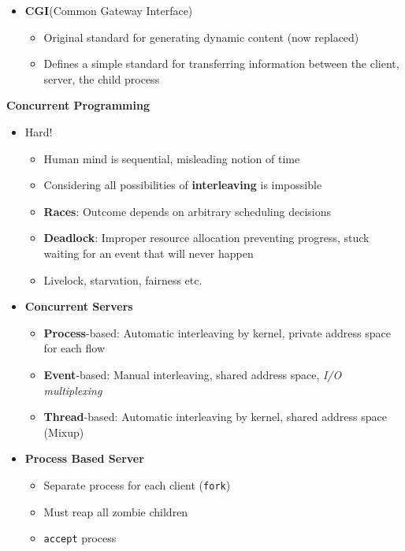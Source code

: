 \documentclass[12pt]{article}
\newcommand{\cname}[1]{\large \textbf{#1}}
\begin{document}
{\begin{itemize}
\begin{itemize}
		\item Server uses \texttt{dup2} to redirect child's \texttt{stdout} to its connected socket
	\end{itemize}
	\item \textbf{CGI}(Common Gateway Interface)
	\begin{itemize}
		\item Original standard for generating dynamic content (now replaced)
		\item Defines a simple standard for transferring information between the client, server, the child process
	\end{itemize}
\end{itemize}

\pagebreak

\cname{Concurrent Programming}
\begin{itemize}
	\item Hard!
	\begin{itemize}
		\item Human mind is sequential, misleading notion of time
		\item Considering all possibilities of \textbf{interleaving} is impossible
		\item \textbf{Races}: Outcome depends on arbitrary scheduling decisions
		\item \textbf{Deadlock}: Improper resource allocation preventing progress, stuck waiting for an event that will never happen
		\item Livelock, starvation, fairness etc.
	\end{itemize}
	\item \textbf{Concurrent Servers}
	\begin{itemize}
		\item \textbf{Process}-based: Automatic interleaving by kernel, private address space for each flow
		\item \textbf{Event}-based: Manual interleaving, shared address space, \textit{I/O multiplexing}
		\item \textbf{Thread}-based: Automatic interleaving by kernel, shared address space (Mixup)
	\end{itemize}
	\item \textbf{Process Based Server}
	\begin{itemize}
		\item Separate process for each client (\texttt{fork})
		\item Must reap all zombie children
		\item \texttt{accept} process

\end{itemize}
\end{itemize}}
\end{document}
